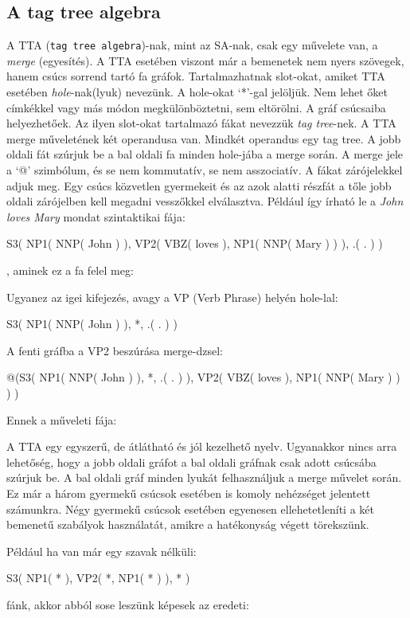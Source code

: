 \subsection{A tag tree algebra}
\label{sec:tta}
A TTA (\texttt{tag tree algebra})-nak, mint az SA-nak, csak egy művelete van, a \textit{merge} (egyesítés). A TTA esetében viszont  már a bemenetek nem nyers szövegek, hanem csúcs sorrend tartó fa gráfok. Tartalmazhatnak slot-okat, amiket TTA esetében \textit{hole}-nak(lyuk) nevezünk. A hole-okat ‘*’-gal jelöljük. Nem lehet őket címkékkel vagy más módon megkülönböztetni, sem eltörölni. A gráf csúcsaiba helyezhetőek. Az ilyen slot-okat tartalmazó fákat nevezzük \textit{tag tree}-nek. A TTA merge műveletének két operandusa van. Mindkét operandus egy tag tree. A jobb oldali fát szúrjuk be a bal oldali fa minden hole-jába a merge során. A merge jele a ‘@’ szimbólum, és se nem kommutatív, se nem asszociatív. A fákat zárójelekkel adjuk meg. Egy csúcs közvetlen gyermekeit és az azok alatti részfát a tőle jobb oldali zárójelben kell megadni vesszőkkel elválasztva. Például így írható le a \textit{John loves Mary} mondat szintaktikai fája:

S3( NP1( NNP( John ) ), VP2( VBZ( loves ),  NP1( NNP( Mary ) ) ), .( . ) )

, aminek ez a fa felel meg:

Ugyanez az igei kifejezés, avagy a VP (Verb Phrase) helyén hole-lal:

S3( NP1( NNP( John ) ), *, .( . ) )

A fenti gráfba a VP2 beszúrása merge-dzsel:

@(S3( NP1( NNP( John ) ), *, .( . ) ),  VP2( VBZ( loves ), NP1( NNP( Mary ) ) ) )

Ennek a műveleti fája:

A TTA egy egyszerű, de átlátható és jól kezelhető nyelv. Ugyanakkor nincs arra lehetőség, hogy a jobb oldali gráfot a bal oldali gráfnak csak adott csúcsába szúrjuk be. A bal oldali gráf minden lyukát felhasználjuk a merge művelet során. Ez már a három gyermekű csúcsok esetében is komoly nehézséget jelentett számunkra. Négy gyermekű csúcsok esetében egyenesen ellehetetleníti a két bemenetű szabályok használatát, amikre a hatékonyság végett törekszünk.

Például ha van már egy szavak nélküli:

S3( NP1( * ), VP2( *,  NP1( * ) ), * )

fánk, akkor abból sose leszünk képesek az eredeti:

